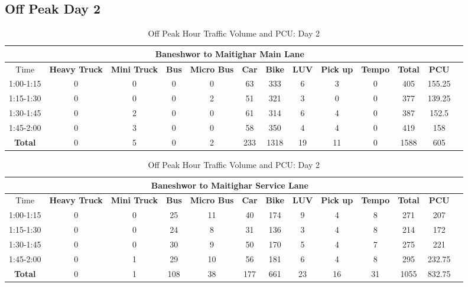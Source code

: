 \begin{landscape}
\centering
\section{Off Peak Day 2}
\begin{table}[h!]
\centering
\caption{Off Peak Hour Traffic Volume and PCU: Day 2}
\begin{tabular}{|c|c|c|c|c|c|c|c|c|c|c|c|c|}
    \hline
    \multicolumn{12}{|c|}{\textbf{Baneshwor to Maitighar Main Lane}} \\
    \hline
        Time & \textbf{Heavy Truck} & \textbf{Mini Truck} & \textbf{Bus} & \textbf{Micro Bus} & \textbf{Car} & \textbf{Bike} & \textbf{LUV} & \textbf{Pick up} & \textbf{Tempo} & \textbf{\textbf{Total}} & \textbf{PCU} \\
    \hline
1:00-1:15	&0	&0	&0	&0	&63	&333	&6	&3	&0	&405	&155.25 \\ \hline
1:15-1:30	&0	&0	&0	&2	&51	&321	&3	&0	&0	&377	&139.25 \\ \hline
1:30-1:45	&0	&2	&0	&0	&61	&314	&6	&4	&0	&387	&152.5 \\ \hline
1:45-2:00	&0	&3	&0	&0	&58	&350	&4	&4	&0	&419	&158 \\ \hline
\textbf{Total}	&0	&5	&0	&2	&233	&1318	&19	&11	&0	&1588	&605 \\ \hline

\end{tabular}

\vspace{0.5cm}
\begin{tabular}{|c|c|c|c|c|c|c|c|c|c|c|c|c|}
    \hline
    \multicolumn{12}{|c|}{\textbf{Baneshwor to Maitighar Service Lane}} \\
    \hline
        Time & \textbf{Heavy Truck} & \textbf{Mini Truck} & \textbf{Bus} & \textbf{Micro Bus} & \textbf{Car} & \textbf{Bike} & \textbf{LUV} & \textbf{Pick up} & \textbf{Tempo} & \textbf{\textbf{Total}} & \textbf{PCU} \\
    \hline
1:00-1:15	&0	&0	&25	&11	&40	&174	&9	&4	&8	&271	&207 \\ \hline
1:15-1:30	&0	&0	&24	&8	&31	&136	&3	&4	&8	&214	&172 \\ \hline
1:30-1:45	&0	&0	&30	&9	&50	&170	&5	&4	&7	&275	&221 \\ \hline
1:45-2:00	&0	&1	&29	&10	&56	&181	&6	&4	&8	&295	&232.75 \\ \hline
\textbf{Total}	&0	&1	&108	&38	&177	&661	&23	&16	&31	&1055	&832.75 \\ \hline
\end{tabular}

\end{table}
\end{landscape}

